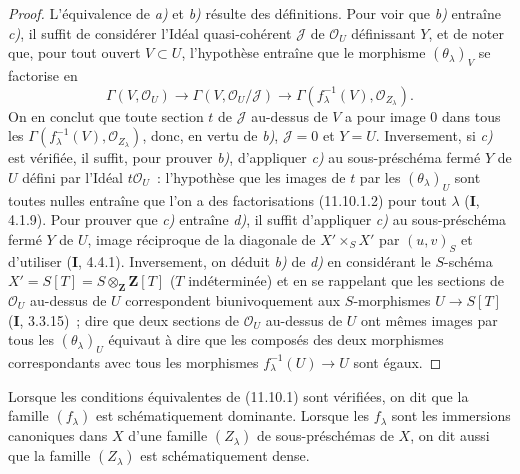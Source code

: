 \begin{proof}
L'équivalence de \emph{a)} et \emph{b)} résulte des définitions. Pour voir que \emph{b)} entraîne
\emph{c)}, il suffit de considérer l'Idéal quasi-cohérent $\mathcal J$ de
$\mathcal O_U$ définissant $Y$, et de noter que, pour tout ouvert $V\subset U$,
l'hypothèse entraîne que le morphisme $(\theta_\lambda)_V$ se factorise en
\[
\Gamma(V,\mathcal O_U)\longrightarrow
\Gamma(V,\mathcal O_U/\mathcal J)\longrightarrow
\Gamma(f_\lambda^{-1}(V),\mathcal O_{Z_\lambda}).
\]
On en conclut que toute section $t$ de $\mathcal J$ au-dessus de $V$ a pour
image 0 dans tous les $\Gamma(f_\lambda^{-1}(V),\mathcal O_{Z_\lambda})$,
donc, en vertu de \emph{b)}, $\mathcal J=0$ et $Y=U$. Inversement, si \emph{c)} est vérifiée,
il suffit, pour prouver \emph{b)}, d'appliquer \emph{c)} au sous-préschéma fermé $Y$ de $U$
défini par l'Idéal $t\mathcal O_U$~: l'hypothèse que les images de $t$ par les
$(\theta_\lambda)_U$ sont toutes nulles entraîne que l'on a des factorisations
(11.10.1.2) pour tout $\lambda$ ($\mathbf I$, 4.1.9). Pour prouver que \emph{c)}
entraîne \emph{d)}, il suffit d'appliquer \emph{c)} au sous-préschéma fermé $Y$ de $U$, image
réciproque de la diagonale de $X'\times_SX'$ par $(u,v)_S$ et d'utiliser
($\mathbf I$, 4.4.1). Inversement, on déduit \emph{b)} de \emph{d)} en considérant le
$S$-schéma $X'=S[T]=S\otimes_{\mathbf Z}\mathbf Z[T]$ ($T$ indéterminée) et en
se rappelant que les sections de $\mathcal O_U$ au-dessus de $U$ correspondent
biunivoquement aux $S$-morphismes $U\to S[T]$ ($\mathbf I$, 3.3.15)~; dire que
deux sections de $\mathcal O_U$ au-dessus de $U$ ont mêmes images par tous les
$(\theta_\lambda)_U$ équivaut à dire que les composés des deux morphismes
correspondants avec tous les morphismes $f_\lambda^{-1}(U)\to U$ sont égaux.
\end{proof}

\begin{definition}[11.10.2]
\label{IV.11.10.2-fr}
Lorsque les conditions équivalentes de \textup{(11.10.1)} sont vérifiées, on dit que la
famille $(f_\lambda)$ est schématiquement dominante. Lorsque les
$f_\lambda$ sont les immersions canoniques dans $X$ d'une famille
$(Z_\lambda)$ de sous-préschémas de $X$, on dit aussi que la famille
$(Z_\lambda)$ est schématiquement dense.
\end{definition}

